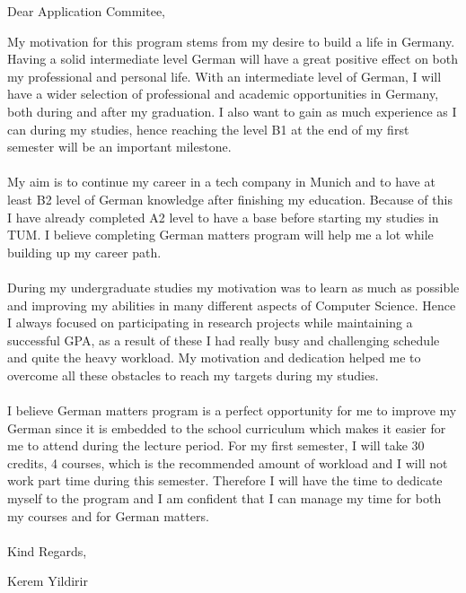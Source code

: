 \documentclass{letter}
\begin{document}
Dear Application Commitee, \par
My motivation for this program stems from my desire to build a life in Germany. Having a solid intermediate level German will have a great positive effect on both my professional and personal life. With an intermediate level of German, I will have a wider selection of professional and academic opportunities in Germany, both during and after my graduation. I also want to gain as much experience as I can during my studies, hence reaching the level B1 at the end of my first semester will be an important milestone.\\\\
My aim is  to continue my career in a tech company in Munich and to  have at least B2 level of German knowledge after finishing my education. Because of this I have already completed A2 level to have a base before starting my studies in TUM. I believe completing German matters program will help me a lot while building up my career path.\\\\
During my undergraduate studies my motivation was to learn as much as possible and improving my abilities in many different aspects of Computer Science. Hence I always focused on participating in research projects while maintaining a successful GPA, as a result of these I had really busy and challenging schedule and quite the heavy workload. My motivation and dedication helped me to overcome all these obstacles to reach my targets during my studies. \\\\
I believe German matters program is a perfect opportunity for me to improve my German since it is embedded to the school curriculum which makes it easier for me to attend during the lecture period. For my first semester, I will take 30 credits, 4 courses, which is the recommended amount of workload and I will not work part time during this semester. Therefore I will have the time to dedicate myself to the program and I am confident that I can manage my time for both my courses and for German matters.
\\\\Kind Regards,
\par Kerem Yildirir
\end{document}
